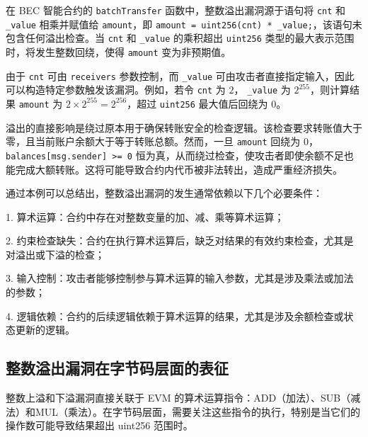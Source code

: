 \documentclass[print, master, vlined, timesmath]{DissertUESTC}
\begin{document}



在 BEC 智能合约的 \texttt{batchTransfer} 函数中，整数溢出漏洞源于语句将 \texttt{cnt} 和 \texttt{\_value} 相乘并赋值给 \texttt{amount}，即 \texttt{amount = uint256(cnt) * \_value;}，该语句未包含任何溢出检查。当 \texttt{cnt} 和 \texttt{\_value} 的乘积超出 \texttt{uint256} 类型的最大表示范围时，将发生整数回绕，使得 \texttt{amount} 变为非预期值。

由于 \texttt{cnt} 可由 \texttt{receivers} 参数控制，而 \texttt{\_value} 可由攻击者直接指定输入，因此可以构造特定参数触发该漏洞。例如，若令 \texttt{cnt} 为 $2$， \texttt{\_value} 为 $2^{255}$，则计算结果 \texttt{amount} 为 $2 \times 2^{255} = 2^{256}$，超过 \texttt{uint256} 最大值后回绕为 $0$。

溢出的直接影响是绕过原本用于确保转账安全的检查逻辑。该检查要求转账值大于零，且当前账户余额大于等于转账总额。然而，一旦 \texttt{amount} 回绕为 $0$，\texttt{balances[msg.sender] >= 0} 恒为真，从而绕过检查，使攻击者即使余额不足也能完成大额转账。这将可能导致合约内代币被非法转出，造成严重经济损失。

通过本例可以总结出，整数溢出漏洞的发生通常依赖以下几个必要条件：

1. 算术运算：合约中存在对整数变量的加、减、乘等算术运算；

2. 约束检查缺失：合约在执行算术运算后，缺乏对结果的有效约束检查，尤其是对溢出或下溢的检查；

3. 输入控制：攻击者能够控制参与算术运算的输入参数，尤其是涉及乘法或加法的参数；

4. 逻辑依赖：合约的后续逻辑依赖于算术运算的结果，尤其是涉及余额检查或状态更新的逻辑。 


\subsection{整数溢出漏洞在字节码层面的表征}
整数上溢和下溢漏洞直接关联于 EVM 的算术运算指令：ADD（加法）、SUB（减法）和MUL（乘法）。在字节码层面，需要关注这些指令的执行，特别是当它们的操作数可能导致结果超出 uint256 范围时。
\end{document}
